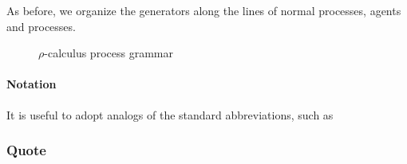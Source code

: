 As before, we organize the generators along the lines of normal processes, agents and processes.


\begin{figure}[tbp]
  \centering
  \caption{ $\rho$-calculus process grammar }
\end{figure}

\paragraph{Notation}

It is useful to adopt analogs of the standard abbreviations, such as


\subsubsection{Quote}


